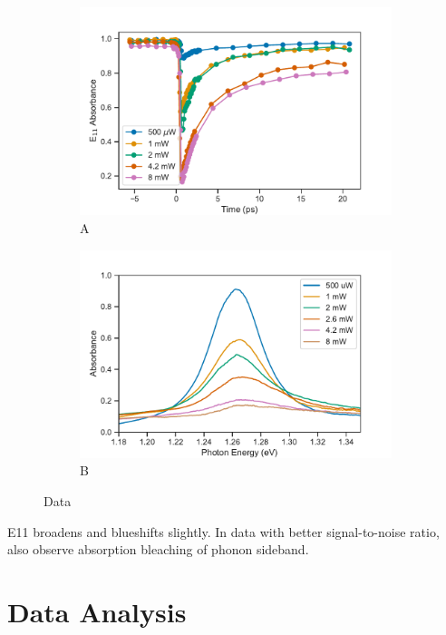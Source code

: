 \begin{figure}[H]
	\centering
	\begin{subfigure}{0.46\textwidth}
		\centering
		\includegraphics[scale=0.55]{images/chapter_my_data/absorbance_dynamics_E11}
		\caption{A}
	\end{subfigure}
	\qquad
	\centering
	\begin{subfigure}{0.46\textwidth}
		\centering
		\includegraphics[scale=0.55]{images/chapter_my_data/peak_abs_vs_pump}
		\caption{B}
	\end{subfigure}
	\caption{Data}
\end{figure}

E11 broadens and blueshifts slightly. In data with better signal-to-noise ratio, also observe absorption bleaching of phonon sideband.

\section{Data Analysis}

